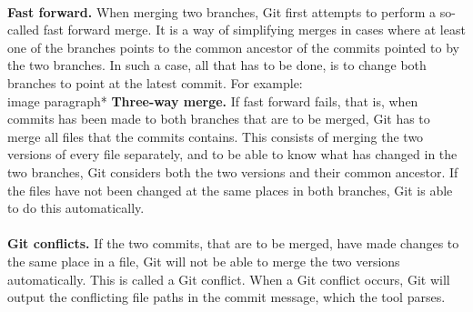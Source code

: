 \paragraph*{}
\textbf{Fast forward.} When merging two branches, Git first attempts to perform a so-called fast forward merge. It is a way of simplifying merges in cases where at least one of the branches points to the common ancestor of the commits pointed to by the two branches. In such a case, all that has to be done, is to change both branches to point at the latest commit. For example:\\
image
paragraph*{}
\textbf{Three-way merge.} If fast forward fails, that is, when commits has been made to both branches that are to be merged, Git has to merge all files that the commits contains. This consists of merging the two versions of every file separately, and to be able to know what has changed in the two branches, Git considers both the two versions and their common ancestor. If the files have not been changed at the same places in both branches, Git is able to do this automatically.
\paragraph*{}
\textbf{Git conflicts.} If the two commits, that are to be merged, have made changes to the same place in a file, Git will not be able to merge the two versions automatically. This is called a Git conflict. When a Git conflict occurs, Git will output the conflicting file paths in the commit message, which the tool parses.
